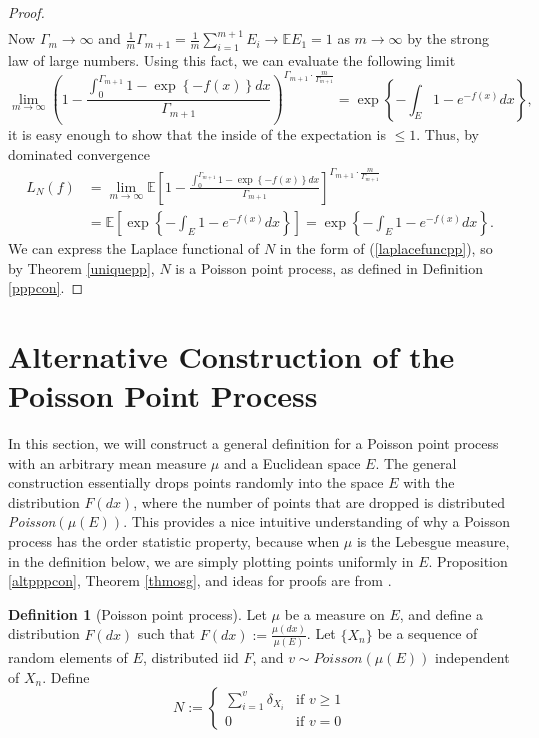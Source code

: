 \documentclass[11pt, oneside]{article}   	%
\theoremstyle{definition}
\newtheorem{definition}{Definition}[section]
\theoremstyle{remark}
\begin{document}
\begin{proof}
\begin{align*}
  \end{align*}
  Now $\Gamma_m \to \infty$ and $\frac{1}{m} \Gamma_{m+1} = \frac{1}{m} \sum_{i=1}^{m+1} E_i \to \mathbb{E}E_1 = 1$ as $m \to \infty$ by the strong law of large numbers. Using this fact, we can evaluate the following limit
$$\lim_{m \to \infty}\left( 1- \frac{\int_0^{\Gamma_{m+1}} 1- \exp \left\{-f(x) \right\} d x }{\Gamma_{m+1}} \right)^{\Gamma_{m+1} \cdot \frac{m}{\Gamma_{m+1}}} = \exp \left\{ -\int_{E}1-e^{-f(x)}dx \right\},$$ 
it is easy enough to show that the inside of the expectation is $\leq 1$. Thus, by dominated convergence
\begin{align*}
  L_N(f) &= \lim_{m \to \infty} \mathbb{E} \left[ 1- \frac{\int_0^{\Gamma_{m+1}} 1- \exp \left\{-f(x) \right\} d x }{\Gamma_{m+1}} \right]^{\Gamma_{m+1} \cdot \frac{m}{\Gamma_{m+1}}} \\
	 &= \mathbb{E} \left[ \exp \left\{ -\int_{E}1-e^{-f(x)}dx \right\} \right] = \exp \left\{ -\int_{E}1-e^{-f(x)}dx \right\}.
\end{align*}
We can express the Laplace functional of $N$ in the form of (\ref{laplacefuncpp}), so by Theorem \ref{uniquepp}, $N$ is a Poisson point process, as defined in Definition \ref{pppcon}.

\end{proof}


\newpage
\section{Alternative Construction of the Poisson Point Process}

In this section, we will construct a general definition for a Poisson point process with an arbitrary mean measure $\mu$ and a Euclidean space $E$. The general construction essentially drops points randomly into the space $E$ with the distribution $F(dx)$, where the number of points that are dropped is distributed \textit{Poisson}$(\mu(E))$. This provides a nice intuitive understanding of why a Poisson process has the order statistic property, because when $\mu$ is the Lebesgue measure, in the definition below, we are simply plotting points uniformly in $E$. Proposition \ref{altpppcon}, Theorem \ref{thmosg}, and ideas for proofs are from \cite{resnick2005}.

\begin{definition}[Poisson point process] \label{genppp}
  Let $\mu$ be a measure on $E$, and define a distribution $F(dx)$ such that $F(dx) := \frac{\mu(dx)}{\mu(E)}$. Let $\{X_n\}$ be a sequence of random elements of $E$, distributed iid $F$, and $v \sim \textit{Poisson}(\mu(E))$ independent of ${X_n}$. Define
  $$N := \begin{cases}
    \sum_{i=1}^v \delta_{X_i} & \text{if } v \geq 1 \\
  0 & \text{if } v = 0
\end{cases}$$
\end{definition}
\end{document}
